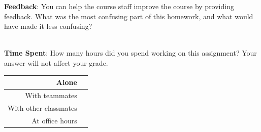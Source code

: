 \documentclass[12pt]{article}
\begin{document}
\textbf{Feedback}: You can help the course staff improve the course by providing feedback. What was the most confusing part of this homework, and what would have made it less confusing?

\begin{tcolorbox}[fit,height=10em, width=40em, blank, borderline={1pt}{1pt},nobeforeafter]
            \begin{center}
            \end{center}
            \end{tcolorbox}\\

\noindent\textbf{Time Spent}: How many hours did you spend working on this assignment? Your answer will not affect your grade.

\begin{tcolorbox}[fit,height=8em, width=40em, blank, borderline={1pt}{1pt},nobeforeafter]
\begin{table}[H]
    \centering
    \begin{tabular}{r|c}
        Alone &  \hspace{3em}  %
        \\ \hline
        With teammates & \hspace{3em}  %
        \\ \hline
        With other classmates & \hspace{3em}  %
        \\ \hline
        At office hours & \hspace{3em}  %
        \\ \hline
    \end{tabular}
        
\end{table}
\end{tcolorbox}
\end{document}
